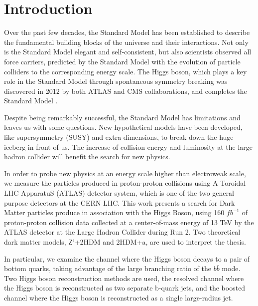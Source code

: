 \chapter{Introduction}

\label{ch:intro}
\par Over the past few decades, the Standard Model has been established to describe the fundamental building blocks of the universe and their interactions.
 Not only is the Standard Model elegant and self-consistent, but also scientists observed all force carriers, predicted by the Standard Model with the evolution of particle colliders to the corresponding energy scale.
The Higgs boson, which plays a key role in the Standard Model through spontaneous symmetry breaking was discovered in 2012 by both ATLAS and CMS collaborations, 
and completes the Standard Model\cite{Aad:2012tfa} \cite{Chatrchyan:2012xdj}.

\par Despite being remarkably successful, the Standard Model has limitations and leaves us with some questions. 
New hypothetical models have been developed, like supersymmetry (SUSY) and extra dimensions,
to break down the huge iceberg in front of us. The increase of collision energy and luminosity at the large hadron collider will benefit the search for new physics.

\par In order to probe new physics at an energy scale higher than electroweak scale,
 we measure the particles produced in proton-proton collisions using A Toroidal LHC ApparatuS (ATLAS) detector system,
 which is one of the two general purpose detectors at the CERN LHC. This work presents a search for Dark Matter particles produce in association
with the Higgs Boson, using 160 $fb^{-1}$ of proton-proton collision data collected at a center-of-mass energy of 13 TeV
by the ATLAS detector at the Large Hadron Collider during Run 2. Two theoretical dark matter models, Z'+2HDM and 
2HDM+a, are used to interpret the thesis.

\par In particular, we examine the channel where the Higgs boson decays to a pair of bottom quarks, taking advantage of the large branching ratio of the $b\bar{b}$ mode. 
Two Higgs boson reconstruction methods are used, the resolved channel where the Higgs boson is reconstructed as two separate b-quark jets, 
and the boosted channel where the Higgs boson is reconstructed as a single large-radius jet.

